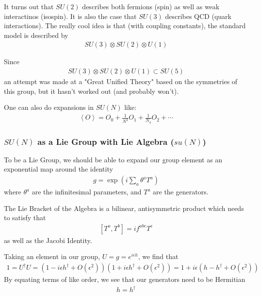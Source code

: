 It turns out that \(SU(2)\) describes both fermions (spin) as well as weak interactinos (isospin). It is also the case that \(SU(3)\) describes QCD (quark interactions). The really cool idea is that (with coupling constants), the standard model is described by \begin{align*}
    SU(3) \otimes SU(2) \otimes U(1)
\end{align*}

Since \begin{align*}
    SU(3) \otimes SU(2) \otimes U(1) \subset SU(5)
\end{align*}
an attempt was made at a "Great Unified Theory" based on the symmetries of this group, but it hasn't worked out (and probably won't). 

One can also do expansions in \(SU(N)\) like:
\begin{align*}
    \left\langle O \right\rangle = O_0 + \frac{1}{N^{2} } O_1 + \frac{1}{N_4} O_2 + \cdots 
\end{align*}

\subsubsection{\(SU(N)\) as a Lie Group with Lie Algebra (\(su(N)\))}
To be a Lie Group, we should be able to expand our group element as an exponential map around the identity\begin{align*}
    g = \exp \left( i \sum_{a} \theta  ^a  T^ a\right) 
\end{align*}
where \(\theta ^a\) are the infinitesimal parameters, and \(T^a\) are the generators.

The Lie Bracket of the Algebra is a bilinear, antisymmetric product which needs to satisfy that \begin{align*}
    \left[ T^a, T^b \right] = i f^{abc} T^c
\end{align*}
as well as the Jacobi Identity.

Taking an element in our group, \(U = g = e^{i \epsilon h}\), we find that \begin{align*}
    1 = U^{\dagger} U = \left( 1 - i \epsilon h ^{\dagger} + O(\epsilon ^{2} ) \right)\left( 1 + i \epsilon h ^{\dagger} + O(\epsilon ^{2} ) \right) = 1 + i \epsilon (h - h ^{\dagger} + O(\epsilon ^{2} ))
\end{align*} 
By equating terms of like order, we see that our generators need to be Hermitian\begin{align*}
    h = h^{\dagger} 
\end{align*}

